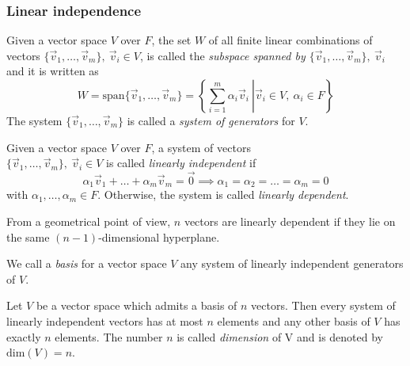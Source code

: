 



\subsubsection{Linear independence}

\begin{definition}
    Given a vector space $V$ over $F$, the set $W$ of all finite linear combinations of vectors $\{\vec{v}_1, \hdots, \vec{v}_m\},\ \vec{v}_i \in V$, is called the \textit{subspace spanned by $\{\vec{v}_1, \hdots, \vec{v}_m\},\ \vec{v}_i$} and it is written as
    $$ W = \text{span}\{\vec{v}_1, \hdots, \vec{v}_m\} = \left\{ \left.\sum_{i=1}^{m}{\alpha_i\vec{v}_i} \ \right\vert \vec{v}_i \in V,\ \alpha_i \in F \right\} $$
    The system $\{\vec{v}_1, \hdots, \vec{v}_m\}$ is called a \textit{system of generators} for $V$.
\end{definition}



\begin{definition}
    Given a vector space $V$ over $F$, a system of vectors\\ $\{\vec{v}_1, \hdots, \vec{v}_m\},\ \vec{v}_i \in V$ is called \textit{linearly independent} if
    $$ \alpha_1\vec{v}_1 + \hdots + \alpha_m\vec{v}_m = \vec{0} \implies \alpha_1 = \alpha_2 = \hdots = \alpha_m = 0 $$
    with $\alpha_1, \hdots, \alpha_m \in F$. Otherwise, the system is called \textit{linearly dependent}.
\end{definition}

From a geometrical point of view, $n$ vectors are linearly dependent if they lie on the same $(n-1)$-dimensional hyperplane.



\begin{definition}
    We call a \textit{basis} for a vector space $V$ any system of linearly independent generators of $V$.
\end{definition}



\begin{proposition}
    Let $V$ be a vector space which admits a basis of $n$ vectors. Then every system of linearly independent vectors has at most $n$ elements and any other basis of $V$ has exactly $n$ elements. The number $n$ is called \textit{dimension} of V and is denoted by $\text{dim}(V) = n$.
\end{proposition}

